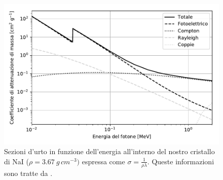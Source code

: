 \begin{figure}[h]
\centering
\includegraphics[width=25 em]{immagini/cross}
\caption{Sezioni d'urto in funzione dell'energia all'interno del nostro cristallo di NaI ($\rho=\SI{3.67}{g\,cm^{-3}})$ espressa come $\sigma=\frac{1}{\rho\lambda}$. Queste informazioni sono tratte da \cite{cross}.}
\label{sezioni}
\end{figure}
